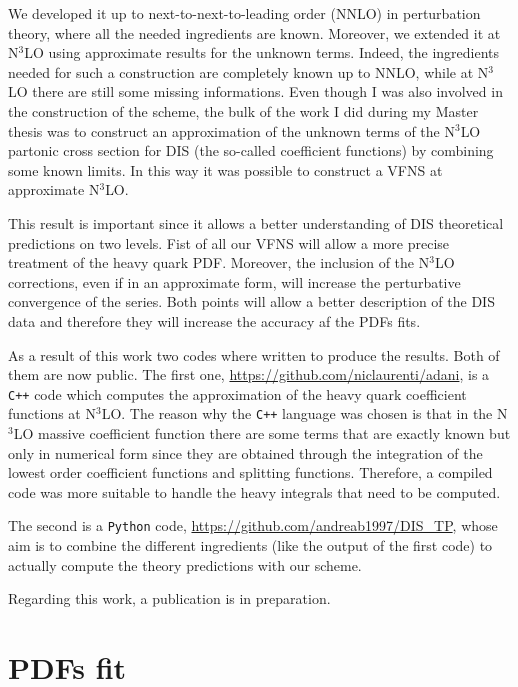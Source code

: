 \documentclass[11pt,a4paper]{moderncv}        %
\begin{document}
We developed it up to next-to-next-to-leading order (NNLO) in perturbation theory, where all the needed ingredients are known.
Moreover, we extended it at N$^3$LO using approximate results for the unknown terms.
Indeed, the ingredients needed for such a construction are completely known up to NNLO, while at N$^3$LO
there are still some missing informations.
Even though I was also involved in the construction of the scheme, the bulk of the work I did during my Master thesis was to
construct an approximation of the unknown terms of the N$^3$LO partonic cross section for DIS (the so-called coefficient functions) by
combining some known limits.
In this way it was possible to construct a VFNS at approximate N$^3$LO.


This result is important since it allows a better understanding of DIS theoretical predictions on two levels.
Fist of all our VFNS will allow a more precise treatment of the heavy quark PDF.
Moreover, the inclusion of the N$^3$LO corrections, even if in an approximate form, will increase the perturbative convergence of the series.
Both points will allow a better description of the DIS data
and therefore they will increase the accuracy af the PDFs fits.

As a result of this work two codes where written to produce the results.
Both of them are now public.
The first one, \url{https://github.com/niclaurenti/adani}, is a \texttt{C++} code 
which computes the approximation of the heavy quark coefficient functions at N$^3$LO.
The reason why the \texttt{C++} language was chosen is that in the N$^3$LO massive coefficient function there are some terms that are
exactly known but only in numerical form since they are obtained through the integration of the lowest order coefficient functions and
splitting functions.
Therefore, a compiled code was more suitable to handle the heavy integrals that need to be computed.

The second is a \texttt{Python} code, \url{https://github.com/andreab1997/DIS_TP}, whose aim is to combine the different ingredients 
(like the output of the first code) to actually
compute the theory predictions with our scheme.

Regarding this work, a publication is in preparation.

\section{PDFs fit}
\end{document}
